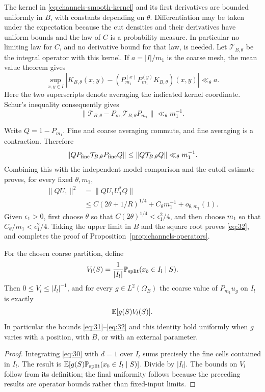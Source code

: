 The kernel in \eqref{eq:channels-smooth-kernel} and its first derivatives
are bounded uniformly in \(B\), with constants depending on \(\theta\).
Differentiation may be taken under the expectation because the
cut densities and their derivatives have uniform bounds and the law
of \(C\) is a probability measure.  In particular no limiting law for
\(C\), and no derivative bound for that law, is needed.
Let \(\mathcal T_{B,\theta}\) be the integral operator with this kernel.
If \(a=|I|/m_1\) is the coarse mesh, the mean value theorem gives
\[
 \sup_{x,y\in I}
 \left|K_{B,\theta}(x,y)
      -(P_{m_1}^{(x)}P_{m_1}^{(y)}K_{B,\theta})(x,y)\right|
 \ll_\theta a.
\]
Here the two superscripts denote averaging the indicated kernel
coordinate.  Schur's inequality consequently gives
\begin{equation}\label{eq:channels-coarse-kernel}
 \|\mathcal T_{B,\theta}
           -P_{m_1}\mathcal T_{B,\theta}P_{m_1}\|
 \ll_\theta m_1^{-1}.
\end{equation}

Write \(Q=1-P_{m_1}\).  Fine and coarse averaging commute, and fine
averaging is a contraction.  Therefore
\[
 \|Q P_{\rm fine}\mathcal T_{B,\theta}P_{\rm fine}Q\|
 \le \|Q\mathcal T_{B,\theta}Q\|
 \ll_\theta m_1^{-1}.
\]
Combining this with the independent-model comparison and the cutoff
estimate proves, for every fixed \(\theta,m_1\),
\[
 \begin{split}
 \|Q U_1\|^2
 &=\|Q U_1U_1^*Q\|\\
 &\le C(2\theta+1/R)^{1/4}
        +C_\theta m_1^{-1}+o_{\theta,m_1}(1).
 \end{split}
\]
Given \(\epsilon_1>0\), first choose \(\theta\) so that
\(C(2\theta)^{1/4}<\epsilon_1^2/4\), and then choose \(m_1\) so that
\(C_\theta/m_1<\epsilon_1^2/4\).
Taking the upper limit in \(B\) and the square root proves
\eqref{eq:32}, and completes the proof of
Proposition~\ref{prop:channels-operators}.

\begin{corollary}\label{cor:channels-features}
For the chosen coarse partition, define
\[
 V_l(S)=\frac1{|I_l|}
          \mathbb P_{\rm split}(x_b\in I_l\mid S).
\]
Then \(0\le V_l\le |I_l|^{-1}\), and for every \(g\in L^2(\Omega_B)\)
the coarse value of \(P_{m_1}u_g\) on \(I_l\) is exactly
\[
 \mathbb E[g(S)V_l(S)].
\]
In particular the bounds \eqref{eq:31}--\eqref{eq:32} and this identity
hold uniformly when \(g\) varies with a position, with \(B\), or with
an external parameter.
\end{corollary}

\begin{proof}
Integrating \eqref{eq:30} with \(d=1\) over \(I_l\) sums precisely the
fine cells contained in \(I_l\).  The result is
\(\mathbb E[g(S)\mathbb P_{\rm split}(x_b\in I_l\mid S)]\).
Divide by \(|I_l|\).  The bounds on \(V_l\) follow from its definition;
the final uniformity follows because the preceding results are
operator bounds rather than fixed-input limits.
\end{proof}
